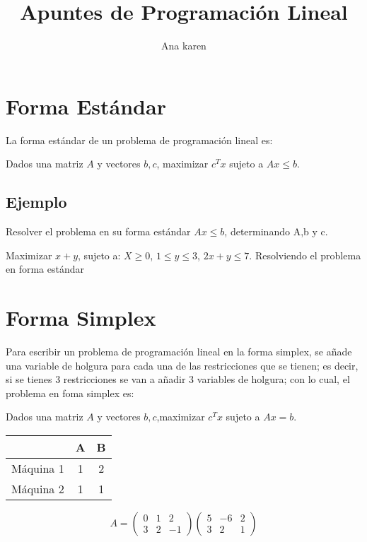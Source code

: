 \documentclass{article}
\title{Apuntes de Programación Lineal}
\author{Ana karen}
\begin{document}
\maketitle
\tableofcontents
\section{Forma Estándar}
\label{sec:forma-estandar-y}

La forma estándar de un problema de programación lineal es:

Dados una matriz $A$ y vectores $b,c$, maximizar $c^Tx$ sujeto a $Ax\leq b$.
\subsection{Ejemplo}
Resolver el problema en su forma estándar $Ax\leq b$, determinando A,b y c.

Maximizar $x+y$, sujeto a: $X\geq 0$, $1\leq y\leq 3$, $2x+y\leq 7$.
Resolviendo el problema en forma estándar 

\section{Forma Simplex}
\label{sec:forma-simplex}

Para escribir un problema de programación lineal en la forma simplex, se añade una variable de holgura para cada una de las restricciones que se tienen; es decir, si se tienes 3 restricciones se van a añadir 3 variables de holgura; con lo cual, el problema en foma simplex es:

Dados una matriz $A$ y vectores $b,c$,maximizar $c^Tx$ sujeto a $Ax=b$.\\


\begin{tabular}{|c|c|c|}
  \hline
  & A & B \\
  \hline
  Máquina 1 & 1 & 2 \\
  \hline
  Máquina 2 & 1 & 1 \\
  \hline
\end{tabular}

\begin{equation*}
  \label{eq:1}
  A=
  \begin{pmatrix}
    0 & 1 & 2\\
    3 & 2 & -1
  \end{pmatrix}
  \begin{pmatrix}
    5 & -6 & 2\\
    3 & 2 & 1
   \end{pmatrix}
\end{equation*}
\end{document}

